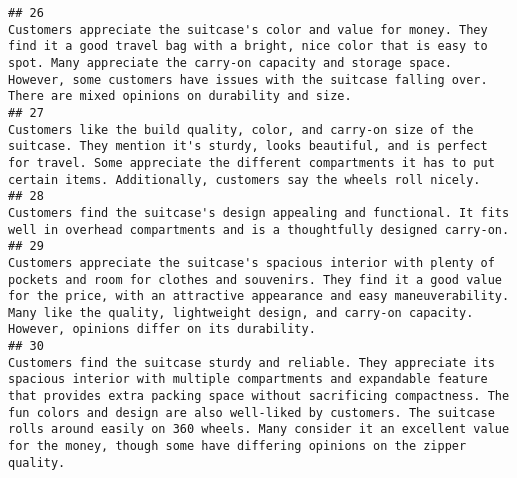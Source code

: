 \documentclass[
]{article}
\begin{document}
\begin{verbatim}
## 26                                                                                                                                                                                                                                                                                                Customers appreciate the suitcase's color and value for money. They find it a good travel bag with a bright, nice color that is easy to spot. Many appreciate the carry-on capacity and storage space. However, some customers have issues with the suitcase falling over. There are mixed opinions on durability and size.
## 27                                                                                                                                                                                                                                                                                                                                              Customers like the build quality, color, and carry-on size of the suitcase. They mention it's sturdy, looks beautiful, and is perfect for travel. Some appreciate the different compartments it has to put certain items. Additionally, customers say the wheels roll nicely.
## 28                                                                                                                                                                                                                                                                                                                                                                                                                                                                              Customers find the suitcase's design appealing and functional. It fits well in overhead compartments and is a thoughtfully designed carry-on.
## 29                                                                                                                                                                                                                                                                                            Customers appreciate the suitcase's spacious interior with plenty of pockets and room for clothes and souvenirs. They find it a good value for the price, with an attractive appearance and easy maneuverability. Many like the quality, lightweight design, and carry-on capacity. However, opinions differ on its durability.
## 30                                                                                                                                                                                      Customers find the suitcase sturdy and reliable. They appreciate its spacious interior with multiple compartments and expandable feature that provides extra packing space without sacrificing compactness. The fun colors and design are also well-liked by customers. The suitcase rolls around easily on 360 wheels. Many consider it an excellent value for the money, though some have differing opinions on the zipper quality.

\end{verbatim}
\end{document}
